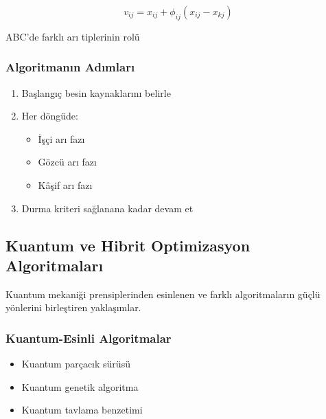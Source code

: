 \begin{equation}
v_{ij} = x_{ij} + \phi_{ij}(x_{ij} - x_{kj})
\end{equation}

\begin{marginfigure}
\centering
{}
\caption{ABC'de farklı arı tiplerinin rolü}
\label{fig:abc_bees}
\end{marginfigure}

\subsubsection{Algoritmanın Adımları}
\begin{enumerate}
    \item Başlangıç besin kaynaklarını belirle
    \item Her döngüde:
        \begin{itemize}
            \item İşçi arı fazı
            \item Gözcü arı fazı
            \item Kâşif arı fazı
        \end{itemize}
    \item Durma kriteri sağlanana kadar devam et
\end{enumerate}

\subsection{Kuantum ve Hibrit Optimizasyon Algoritmaları}
Kuantum mekaniği prensiplerinden esinlenen ve farklı algoritmaların güçlü yönlerini birleştiren yaklaşımlar.

\subsubsection{Kuantum-Esinli Algoritmalar}
\begin{itemize}
    \item Kuantum parçacık sürüsü
    \item Kuantum genetik algoritma
    \item Kuantum tavlama benzetimi
\end{itemize}

